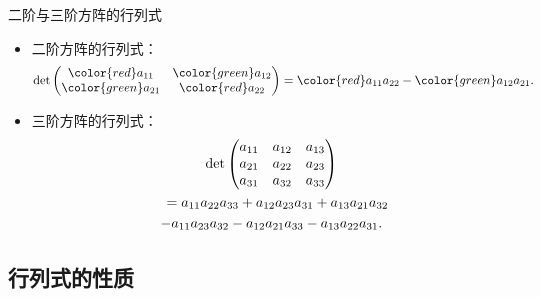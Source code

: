 
\begin{frame}

\begin{block}{二阶与三阶方阵的行列式}
\begin{itemize}
\item<2-> 二阶方阵的行列式：
\[\det \begin{pmatrix} {\color{red}a_{11}} & {\color{green}a_{12}} \\ {\color{green}a_{21}} & {\color{red}a_{22}} \end{pmatrix} = {\color{red}a_{11}a_{22}} - {\color{green}a_{12}a_{21}}.\]
\item<3-> 三阶方阵的行列式：
\begin{multline*}
\det \begin{pmatrix} a_{11} & a_{12} & a_{13} \\ a_{21} & a_{22} & a_{23} \\ a_{31} & a_{32} & a_{33} \end{pmatrix} \\
\shoveleft{= a_{11}a_{22}a_{33} + a_{12}a_{23}a_{31} + a_{13}a_{21}a_{32}} \\
- a_{11}a_{23}a_{32} - a_{12}a_{21}a_{33} - a_{13}a_{22}a_{31}.
\end{multline*}
\end{itemize}
\end{block}

\end{frame}


\subsection{行列式的性质}


